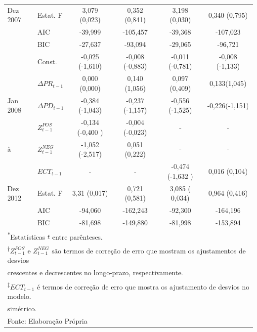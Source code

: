 \documentclass[
	article,			%
	12pt,				%
	openright,			%
	oneside,			%
	a4paper,			%
	english,			%
	brazil				%
	]{abntex2}
\begin{document}
\begin{table}[htbp]
\begin{tabularx}{\textwidth}{X||l|c|c|c|c}
Dez 2007	  & Estat. F &  3,079 (0,023)      &  0,352 (0,841)     &   3,198 (0,030)     &  0,340 (0,795) \\
        	  & AIC   &  -39,999     &    -105,457    &   -39,368    & -107,023  \\
        	  & BIC   &     -27,637  &  -93,094     &  -29,065     &  -96,721 \\ \hline
           	 & Const. &  -0,025 (-1,610)     &   -0,008 (-0,883)    &  -0,011 (-0,781)     & -0,008 (-1,133) \\
        	 & $\Delta PR_{t-1}$ & 0,000 (0,000)     & 0,140 (1,056)    &  0,097 (0,409)    &  0,133(1,045) \\
Jan 2008   & $\Delta PD_{t-1}$ & -0,384 (-1,043)      &  -0,237 (-1,157)     &  -0,556 (-1,525)      &  -0,226(-1,151) \\
     	       & $Z^{POS}_{t-1}$ &   -0,134 (-0,400 )    &  -0,004 (-0,023)   &  -     &  - \\
	à	  & $Z^{NEG}_{t-1}$ & -1,052 (-2,517)      & 0,051 (0,222)      & -      & - \\
                & $ECT_{t-1}$   	& 	-		  & 		-	&       -0,474 (-1,632 )		& 0,016 (0,104)  \\
Dez 2012    & Estat. F &  3,31 (0,017)    &  0,721 (0,581)    &  3,085 ( 0,034)     & 0,964 (0,416)  \\
                & AIC   &  -94,060     &  -162,243     &  -92,300     & -164,196  \\
                & BIC   &    -81,698   &   -149,880    &    -81,998    & -153,894 \\
          \bottomrule
  \multicolumn{6}{l}{\textsuperscript{$\ast$}Estatísticas $t$ entre parênteses.} \\
  \multicolumn{6}{l}{\textsuperscript{$\dagger$}$Z^{POS}_{t-1}$ e $Z^{NEG}_{t-1}$ são termos de correção de erro que mostram os ajustamentos de desvios}\\
  \multicolumn{6}{l}{crescentes e decrescentes no longo-prazo, respectivamente.} \\
  \multicolumn{6}{l}{\textsuperscript{$\ddagger$}$ECT_{t-1}$ é termos de correção de erro que mostra os ajustamento de desvios no modelo.}\\ 
  \multicolumn{6}{l}{simétrico.} \\
\hline  \multicolumn{4}{l}{Fonte: Elaboração Própria} \\ 
        \end{tabularx}%
  \label{ecm}%
\end{table}%
\end{document}
